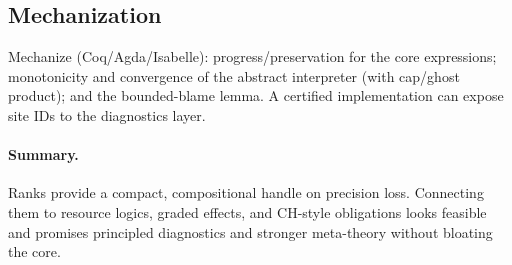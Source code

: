 \subsection{Mechanization}
Mechanize (Coq/Agda/Isabelle): progress/preservation for the core expressions; monotonicity and convergence of the abstract interpreter (with cap/ghost product); and the bounded-blame lemma. A certified implementation can expose site IDs to the diagnostics layer.

\paragraph{Summary.}
Ranks provide a compact, compositional handle on precision loss. Connecting them to resource logics, graded effects, and CH-style obligations looks feasible and promises principled diagnostics and stronger meta-theory without bloating the core.
